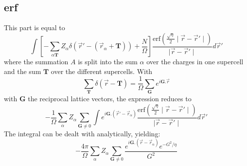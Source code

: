 \documentclass[11pt,a4paper]{article}
\begin{document}
\subsection{erf}
This part is equal to
\begin{equation}
\int \left[ - \sum\limits_{\alpha \mathbf{T}} Z_{\alpha} \delta(\vec{r}' - (\vec{r}_{\alpha} + \mathbf{T})) + \frac{N}{\Omega} \right]  \frac{\text{erf}\left( \frac{\sqrt{\eta}}{2} \mid \vec{r} - \vec{r}' \mid \right)}{\mid \vec{r} - \vec{r}' \mid} d\vec{r}'
\end{equation}
where the summation $A$ is split into the sum $\alpha$ over the charges in one supercell and the sum $\mathbf{T}$ over the different supercells. With
\begin{equation}
\sum\limits_{\mathbf{T}} \delta(\vec{r} - \mathbf{T}) = \frac{1}{\Omega} \sum\limits_{\mathbf{G}} e^{i \mathbf{G} . \vec{r}}
\end{equation}
with $\mathbf{G}$ the reciprocal lattice vectors, the expression reduces to
\begin{equation}
-\frac{1}{\Omega} \sum\limits_{\alpha} Z_{\alpha} \sum\limits_{\mathbf{G} \neq 0} \int e^{i \mathbf{G}.(\vec{r}' - \vec{r}_{\alpha})} \frac{\text{erf}\left( \frac{\sqrt{\eta}}{2} \mid \vec{r} - \vec{r}' \mid \right)}{\mid \vec{r} - \vec{r}' \mid} d\vec{r}'
\end{equation}
The integral can be dealt with analytically, yielding:
\begin{equation}
- \frac{4 \pi}{\Omega} \sum\limits_{\alpha} Z_{\alpha} \sum\limits_{\mathbf{G} \neq 0} \frac{e^{i \mathbf{G}.(\vec{r} - \vec{r}_{\alpha})} e^{-G^2/\eta}}{G^2}
\end{equation}
\end{document}
